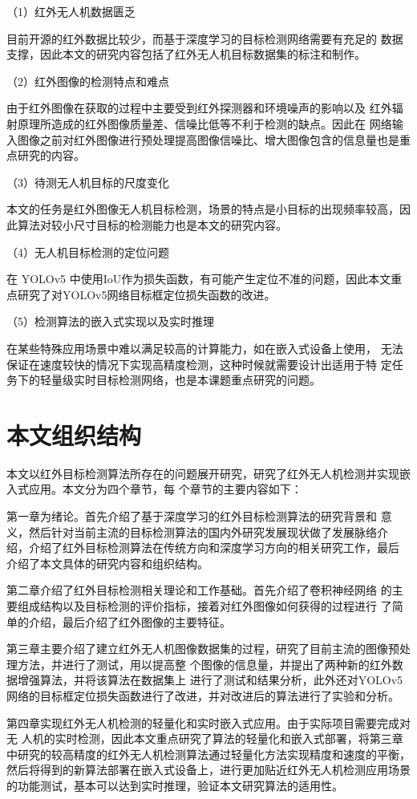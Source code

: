 （1）红外无人机数据匮乏

目前开源的红外数据比较少，而基于深度学习的目标检测网络需要有充足的
数据支撑，因此本文的研究内容包括了红外无人机目标数据集的标注和制作。

（2）红外图像的检测特点和难点

由于红外图像在获取的过程中主要受到红外探测器和环境噪声的影响以及
红外辐射原理所造成的红外图像质量差、信噪比低等不利于检测的缺点。因此在
网络输入图像之前对红外图像进行预处理提高图像信噪比、增大图像包含的信息量也是重点研究的内容。

（3）待测无人机目标的尺度变化

本文的任务是红外图像无人机目标检测，场景的特点是小目标的出现频率较高，因此算法对较小尺寸目标的检测能力也是本文的研究内容。

（4）无人机目标检测的定位问题

在 YOLOv5 中使用IoU作为损失函数，有可能产生定位不准的问题，因此本文重点研究了对YOLOv5网络目标框定位损失函数的改进。

（5）检测算法的嵌入式实现以及实时推理

在某些特殊应用场景中难以满足较高的计算能力，如在嵌入式设备上使用，
无法保证在速度较快的情况下实现高精度检测，这种时候就需要设计出适用于特
定任务下的轻量级实时目标检测网络，也是本课题重点研究的问题。

\section{本文组织结构}
本文以红外目标检测算法所存在的问题展开研究，研究了红外无人机检测并实现嵌入式应用。本文分为四个章节，每
个章节的主要内容如下：

第一章为绪论。首先介绍了基于深度学习的红外目标检测算法的研究背景和
意义，然后针对当前主流的目标检测算法的国内外研究发展现状做了发展脉络介
绍，介绍了红外目标检测算法在传统方向和深度学习方向的相关研究工作，最后
介绍了本文具体的研究内容和组织结构。

第二章介绍了红外目标检测相关理论和工作基础。首先介绍了卷积神经网络
的主要组成结构以及目标检测的评价指标，接着对红外图像如何获得的过程进行
了简单的介绍，最后介绍了红外图像的主要特征。

第三章主要介绍了建立红外无人机图像数据集的过程，研究了目前主流的图像预处理方法，并进行了测试，用以提高整
个图像的信息量，并提出了两种新的红外数据增强算法，并将该算法在数据集上
进行了测试和结果分析，此外还对YOLOv5网络的目标框定位损失函数进行了改进，并对改进后的算法进行了实验和分析。

第四章实现红外无人机检测的轻量化和实时嵌入式应用。由于实际项目需要完成对无
人机的实时检测，因此本文重点研究了算法的轻量化和嵌入式部署，将第三章中研究的较高精度的红外无人机检测算法通过轻量化方法实现精度和速度的平衡，然后将得到的新算法部署在嵌入式设备上，进行更加贴近红外无人机检测应用场景的功能测试，基本可以达到实时推理，验证本文研究算法的适用性。

